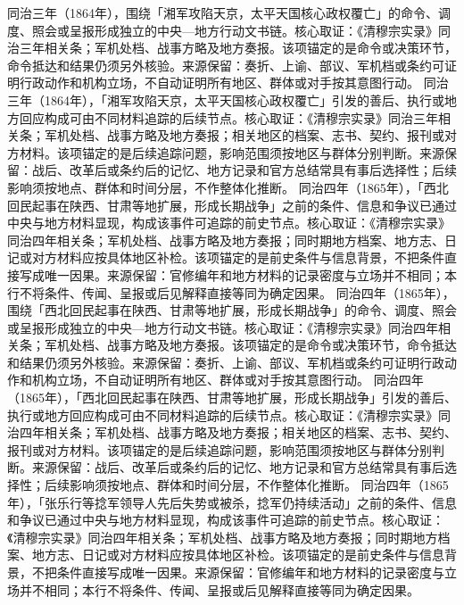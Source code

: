 同治三年（1864年），围绕「湘军攻陷天京，太平天国核心政权覆亡」的命令、调度、照会或呈报形成独立的中央—地方行动文书链。核心取证：《清穆宗实录》同治三年相关条；军机处档、战事方略及地方奏报。该项锚定的是命令或决策环节，命令抵达和结果仍须另外核验。来源保留：奏折、上谕、部议、军机档或条约可证明行政动作和机构立场，不自动证明所有地区、群体或对手按其意图行动。
同治三年（1864年），「湘军攻陷天京，太平天国核心政权覆亡」引发的善后、执行或地方回应构成可由不同材料追踪的后续节点。核心取证：《清穆宗实录》同治三年相关条；军机处档、战事方略及地方奏报；相关地区的档案、志书、契约、报刊或对方材料。该项锚定的是后续追踪问题，影响范围须按地区与群体分别判断。来源保留：战后、改革后或条约后的记忆、地方记录和官方总结常具有事后选择性；后续影响须按地点、群体和时间分层，不作整体化推断。
同治四年（1865年），「西北回民起事在陕西、甘肃等地扩展，形成长期战争」之前的条件、信息和争议已通过中央与地方材料显现，构成该事件可追踪的前史节点。核心取证：《清穆宗实录》同治四年相关条；军机处档、战事方略及地方奏报；同时期地方档案、地方志、日记或对方材料应按具体地区补检。该项锚定的是前史条件与信息背景，不把条件直接写成唯一因果。来源保留：官修编年和地方材料的记录密度与立场并不相同；本行不将条件、传闻、呈报或后见解释直接等同为确定因果。
同治四年（1865年），围绕「西北回民起事在陕西、甘肃等地扩展，形成长期战争」的命令、调度、照会或呈报形成独立的中央—地方行动文书链。核心取证：《清穆宗实录》同治四年相关条；军机处档、战事方略及地方奏报。该项锚定的是命令或决策环节，命令抵达和结果仍须另外核验。来源保留：奏折、上谕、部议、军机档或条约可证明行政动作和机构立场，不自动证明所有地区、群体或对手按其意图行动。
同治四年（1865年），「西北回民起事在陕西、甘肃等地扩展，形成长期战争」引发的善后、执行或地方回应构成可由不同材料追踪的后续节点。核心取证：《清穆宗实录》同治四年相关条；军机处档、战事方略及地方奏报；相关地区的档案、志书、契约、报刊或对方材料。该项锚定的是后续追踪问题，影响范围须按地区与群体分别判断。来源保留：战后、改革后或条约后的记忆、地方记录和官方总结常具有事后选择性；后续影响须按地点、群体和时间分层，不作整体化推断。
同治四年（1865年），「张乐行等捻军领导人先后失势或被杀，捻军仍持续活动」之前的条件、信息和争议已通过中央与地方材料显现，构成该事件可追踪的前史节点。核心取证：《清穆宗实录》同治四年相关条；军机处档、战事方略及地方奏报；同时期地方档案、地方志、日记或对方材料应按具体地区补检。该项锚定的是前史条件与信息背景，不把条件直接写成唯一因果。来源保留：官修编年和地方材料的记录密度与立场并不相同；本行不将条件、传闻、呈报或后见解释直接等同为确定因果。

